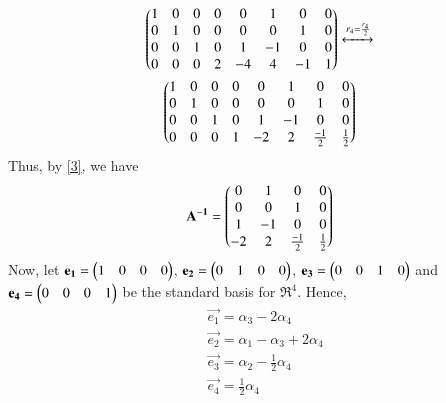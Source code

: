 \documentclass[journal,12pt,twocolumn]{IEEEtran}
\begin{document}
\begin{multline}
\begin{pmatrix}1 & 0 & 0 & 0& 0 &1 &0 & 0 \\0 & 1 & 0 & 0& 0 &0 &1 &0 \\ 0 & 0 & 1 & 0& 1&-1 &0&0  \\ 0 & 0 & 0 & 2& -4 & 4& -1 &1\end{pmatrix} \xleftrightarrow[]{r_4 = \frac{r_4}{2}} \\
\begin{pmatrix}1 & 0 & 0 & 0& 0 &1 &0 & 0 \\0 & 1 & 0 & 0& 0 &0 &1 &0 \\ 0 & 0 & 1 & 0& 1&-1 &0&0  \\ 0 & 0 & 0 & 1& -2 & 2& \frac{-1}{2} & \frac{1}{2}\end{pmatrix}	\label{3}
\end{multline}
Thus, by \eqref{3}, we have
\begin{align}
	\mathbf{A^{-1}}= \begin{pmatrix}0 & 1 & 0 & 0 \\ 0 & 0 & 1 & 0 \\ 1 & -1 & 0 & 0 \\ -2 & 2 & \frac{-1}{2} & \frac{1}{2}\end{pmatrix}
\end{align}
Now, let $\mathbf{e_1} = \begin{pmatrix}1 & 0 & 0 & 0\end{pmatrix}$, $\mathbf{e_2} = \begin{pmatrix}0 & 1 & 0 & 0\end{pmatrix}$, $\mathbf{e_3} = \begin{pmatrix}0 & 0 & 1 & 0\end{pmatrix}$ and $\mathbf{e_4} = \begin{pmatrix}0 & 0 & 0 & 1\end{pmatrix}$ be the standard basis for $\Re^4$. Hence,
\begin{align}
& \vec{e_1} = \alpha_3 - 2 \alpha_4 \\ 
& \vec{e_2} = \alpha_1 - \alpha_3 + 2\alpha_4 \\
& \vec{e_3} = \alpha_2 - \frac{1}{2} \alpha_4 \\
& \vec{e_4} = \frac{1}{2}\alpha_4
\end{align}
\end{document}
